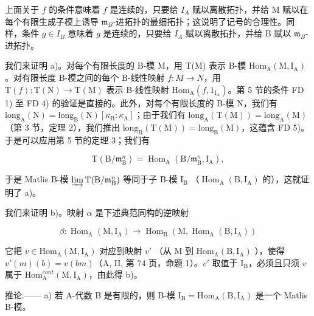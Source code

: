 上面关于 \(f\) 的条件意味着 \(f\) 是连续的，只要给 \(I_A\) 赋以离散拓扑，并给 M 赋以在每个有限生成子模上诱导 \(\mathfrak{m}_B\)-进拓扑的最细拓扑；这说明了记号的合理性。同样，条件 \(g \in I_B\) 意味着 \(g\) 是连续的，只要给 \(I_A\) 赋以离散拓扑，并给 B 赋以 \(\mathfrak{m}_B\)-进拓扑。

我们来证明 a)。对每个有限长度的 B-模 M，用 T(M) 表示 B-模 \(\mathrm{Hom}_{\mathrm{A}}(\mathrm{M},\mathrm{I}_{\mathrm{A}})\)。对有限长度 B-模之间的每个 B-线性映射 \(f:M\to N\)，用 \(\mathrm{T}(f):\mathrm{T}(\mathrm{N})\to\mathrm{T}(\mathrm{M})\) 表示 B-线性映射 \(\mathrm{Hom}_{\mathrm{A}}(f,1_{\mathrm{I}_{\mathrm{A}}})\)。第 5 节的条件 FD 1) 至 FD 4) 的验证是直接的。此外，对每个有限长度的 B-模 N，我们有 \(\mathrm{long}_{\mathrm{A}}(\mathrm{N})=\mathrm{long}_{\mathrm{B}}(\mathrm{N})\left[\kappa_{\mathrm{B}}:\kappa_{\mathrm{A}}\right]\)；由于我们有 \(\mathrm{long}_{\mathrm{A}}(\mathrm{T}(\mathrm{M}))=\mathrm{long}_{\mathrm{A}}(\mathrm{M})\)（第 3 节，定理 2），我们推出 \(\mathrm{long}_{\mathrm{B}}(\mathrm{T}(\mathrm{M}))=\mathrm{long}_{\mathrm{B}}(\mathrm{M})\)，这蕴含 FD 5)。于是可以应用第 5 节的定理 3；我们有

\[
\mathrm{T} (\mathrm{B} / \mathfrak {m} _ {\mathrm{B}} ^ {n}) = \operatorname{Hom} _ {\mathrm{A}} (\mathrm{B} / \mathfrak {m} _ {\mathrm{B}} ^ {n}, \mathrm{I} _ {\mathrm{A}}),
\]

于是 Matlis B-模 \(\varinjlim\mathrm{T}(\mathrm{B}/\mathfrak{m}_{\mathrm{B}}^{n})\) 等同于子 B-模 \(\mathrm{I}_{\mathrm{B}}\) （\(\operatorname{Hom}_{\mathrm{A}}(\mathrm{B},\mathrm{I}_{\mathrm{A}})\) 的），这就证明了 a)。

我们来证明 b)。映射 \(\alpha\) 是下述典范同构的逆映射

\[
\beta : \operatorname{Hom} _ {\mathrm{A}} (\mathrm{M}, \mathrm{I} _ {\mathrm{A}}) \longrightarrow \operatorname{Hom} _ {\mathrm{B}} (\mathrm{M}, \operatorname{Hom} _ {\mathrm{A}} (\mathrm{B}, \mathrm{I} _ {\mathrm{A}}))
\]

它把 \(v \in \mathrm{Hom}_{\mathrm{A}}(\mathrm{M}, \mathrm{I}_{\mathrm{A}})\) 对应到映射 \(v'\) （从 M 到 \(\mathrm{Hom}_{\mathrm{A}}(\mathrm{B}, \mathrm{I}_{\mathrm{A}})\) ），使得 \(v'(m)(b) = v(bm)\)（A, II, 第 74 页，命题 1）。\(v'\) 取值于 \(\mathrm{I}_{\mathrm{B}}\)，必须且只须 \(v\) 属于 \(\mathrm{Hom}_{\mathrm{A}}^{cont}(\mathrm{M}, \mathrm{I}_{\mathrm{A}})\)，由此得 b)。

推论.—— a) 若 A-代数 B 是有限的，则 B-模 \(\mathrm{I_B} = \mathrm{Hom}_{\mathrm{A}}(\mathrm{B},\mathrm{I}_{\mathrm{A}})\) 是一个 Matlis B-模。

